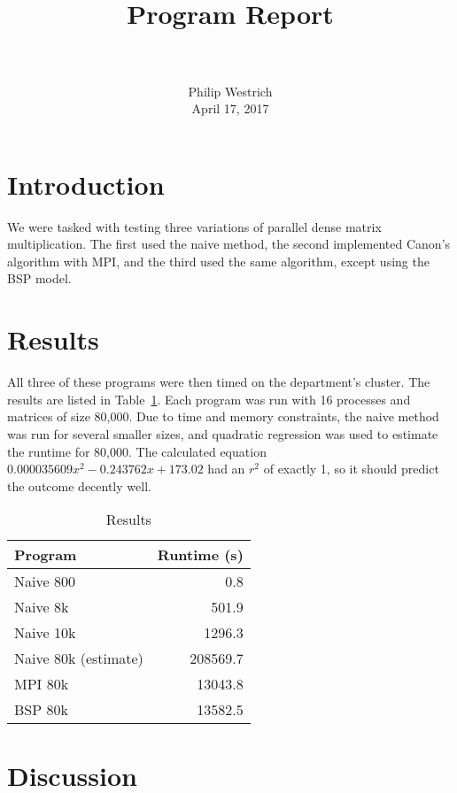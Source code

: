 \documentclass[paper=letter, fontsize=10pt]{scrartcl}
\title{
		\usefont{OT1}{bch}{b}{n}
		\horrule{0.5pt} \\[0.4cm]
		\huge Program Report \\
		\horrule{2pt} \\[0.5cm]
}
\author{
		\normalfont 						\normalsize
        Philip Westrich\\[-3pt]		\normalsize
        April 17, 2017
}
\date{}
\begin{document}
\maketitle

\section{Introduction}

We were tasked with testing three variations of parallel dense matrix multiplication. The first used the naive method, 
the second implemented Canon's algorithm with MPI, and the third used the same algorithm, except using the BSP model. 

\section{Results}

All three of these programs were then timed on the department's cluster. The results are listed in Table~\ref{tab:results}.
Each program was run with 16 processes and matrices of size 80,000. Due to time and memory constraints, the naive method 
was run for several smaller sizes, and quadratic regression was used to estimate the runtime for 80,000. The calculated 
equation $0.000035609x^2 - 0.243762x + 173.02$ had an $r^2$ of exactly 1, so it should predict the outcome decently well.

\begin{table}[H]
   \centering
   \caption{Results}
   \label{tab:results}
   \begin{tabular}{lr}
      Program                & Runtime (s) \\ \hline
      Naive 800              & 0.8         \\
      Naive 8k               & 501.9       \\
      Naive 10k              & 1296.3      \\
      Naive 80k (estimate)   & 208569.7    \\
      MPI 80k                & 13043.8     \\
      BSP 80k                & 13582.5     \\  
   \end{tabular}
\end{table}

\section{Discussion}
\end{document}
